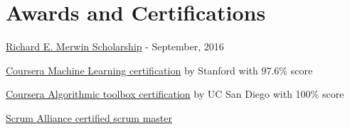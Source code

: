 \documentclass[a4paper,20pt]{article}
\makeatletter
\newcommand{\resumeSubheading}[4]{
  \vspace{-1pt}\item
    \begin{tabular*}{0.97\textwidth}{l@{\extracolsep{\fill}}r}
      \textbf{#1} & #2 \\
      \textit{#3} & \textit{#4} \\
    \end{tabular*}\vspace{-5pt}
}
\newcommand{\resumeSubHeadingListStart}{\begin{itemize}[leftmargin=*]}
\newcommand{\resumeSubHeadingListEnd}{\end{itemize}}
\makeatother
\begin{document}
\section{Awards and Certifications}
  \begin{description}[font=$\bullet$]
    \item \href{https://www.computer.org/volunteering/awards/scholarships/merwin/merwin-winners/2016-merwin-winners}{Richard E. Merwin Scholarship} - September, 2016
    \vspace{-5pt}
    \item \href{https://www.coursera.org/learn/machine-learning}{Coursera Machine Learning certification} by Stanford with 97.6\% score
    \vspace{-5pt}
    \item \href{https://www.coursera.org/learn/algorithmic-toolbox}{Coursera Algorithmic toolbox certification} by UC San Diego with 100\% score
    \vspace{-5pt}
    \item \href{https://www.scrumalliance.org/get-certified/scrum-master-track/certified-scrummaster}{Scrum Alliance certified scrum master}
  \end{description}

\end{document}
